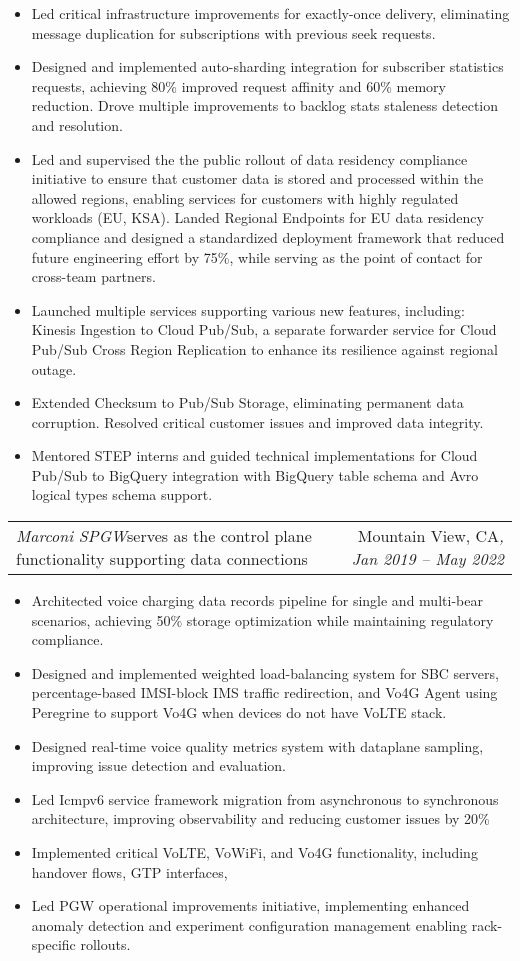 \documentclass[letterpaper,11pt]{article}
\makeatletter
\newcommand{\resumeItem}[1]{
  \item\small{
    {#1 \vspace{-3pt}}
  }
}
\newcommand{\resumeSubSubheadingMultiteam}[4]{
    \begin{tabular*}{0.97\textwidth}{l@{\extracolsep{\fill}}r}
      \textit{\small#1}{\scriptsize #4} & {\small#2}\textit{\small, #3} \\
    \end{tabular*}
    \vspace{-8pt}
}
\newcommand{\resumeItemListStart}{\begin{itemize}}
\newcommand{\resumeItemListEnd}{\end{itemize}\vspace{-5pt}}
\makeatother
\begin{document}
      \resumeItemListStart
\resumeItem{Led critical infrastructure improvements for exactly-once delivery, eliminating message duplication for subscriptions with previous seek requests.}
\resumeItem{Designed and implemented auto-sharding integration for subscriber statistics requests, achieving 80\% improved request affinity and 60\% memory reduction. Drove multiple improvements to backlog stats staleness detection and resolution.}
\resumeItem{Led and supervised the the public rollout of data residency compliance initiative to ensure that customer data is stored and processed 
within the allowed regions, enabling services for customers with highly regulated workloads (EU, KSA). 
Landed Regional Endpoints for EU data residency compliance and 
designed a standardized deployment framework that reduced future engineering effort by 75\%, 
while serving as the point of contact for cross-team partners.}
\resumeItem{Launched multiple services supporting various new features, including: Kinesis Ingestion to Cloud Pub/Sub, a separate forwarder service for Cloud Pub/Sub Cross Region Replication to enhance its resilience against regional outage.}
\resumeItem{Extended Checksum to Pub/Sub Storage, eliminating permanent data corruption. Resolved critical customer issues and improved data integrity.}
\resumeItem{Mentored STEP interns and guided technical implementations for Cloud Pub/Sub to BigQuery integration with BigQuery table schema and Avro logical types schema support.}
      \resumeItemListEnd

  \resumeSubSubheadingMultiteam
   {Marconi SPGW}{Mountain View, CA}{Jan 2019 -- May 2022}
   {serves as the control plane functionality supporting data connections}

      \resumeItemListStart
\resumeItem{Architected voice charging data records pipeline for single and multi-bear scenarios, achieving 50\% storage optimization while maintaining regulatory compliance.}
\resumeItem{Designed and implemented weighted load-balancing system for SBC servers, percentage-based IMSI-block IMS traffic redirection, and Vo4G Agent using Peregrine to support Vo4G when devices do not have VoLTE stack.}
\resumeItem{Designed real-time voice quality metrics system with dataplane sampling, improving issue detection and evaluation.} %
\resumeItem{Led Icmpv6 service framework migration from asynchronous to synchronous architecture, improving observability and reducing customer issues by 20\%}
\resumeItem{Implemented critical VoLTE, VoWiFi, and Vo4G functionality, including handover flows, GTP interfaces, }
\resumeItem{Led PGW operational improvements initiative, implementing enhanced anomaly detection and experiment configuration management enabling rack-specific rollouts.}
      \resumeItemListEnd
\end{document}
